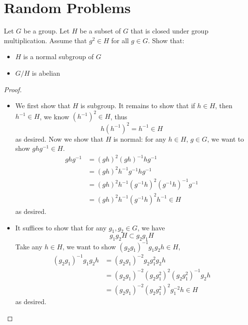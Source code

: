 \section{Random Problems}

\begin{prob}[F2010-Q1]
    Let \( G \) be a group. Let \( H \) be a subset of \( G \) that is closed under group multiplication. Assume that \( g^2 \in H \) for all \( g \in G \). Show that:
    \begin{itemize}
        \item \( H \) is a normal subgroup of \( G \)
        \item \( G/H \) is abelian
    \end{itemize}
\end{prob}
\begin{proof}
    \begin{itemize}
        \item We first show that $H$ is subgroup. It remains to show that if $h\in H$, then $h^{-1}\in H$, we know $(h^{-1})^2\in H$, thus 
        \begin{equation*}
            h(h^{-1})^2=h^{-1}\in H
        \end{equation*}
        as desired.  Now we show that $H$ is normal: for any $h\in H$, $g\in G$, we want to show $ghg^{-1}\in H$.
        \begin{align*}
            ghg^{-1}&=(gh)^2(gh)^{-1}hg^{-1}\\
            &=(gh)^2h^{-1}g^{-1}hg^{-1}\\
            &=(gh)^2h^{-1}(g^{-1}h)^2(g^{-1}h)^{-1}g^{-1}\\
            &=(gh)^2h^{-1}(g^{-1}h)^2h^{-1}\in H
        \end{align*}
        as desired.
        \item It suffices to show that for any $g_1,g_2\in G$, we have 
        \begin{equation*}
            g_1g_2H\subset g_2g_1H
        \end{equation*}
        Take any $h\in H$, we want to show $(g_2g_1)^{-1}g_1g_2h\in H$,
        \begin{align*}
            (g_2g_1)^{-1}g_1g_2h&=(g_2g_1)^{-2}g_2g_1^2g_2h\\
            &=(g_2g_1)^{-2}(g_2g_1^2)^2(g_2g_1^2)^{-1}g_2h\\
            &=(g_2g_1)^{-2}(g_2g_1^2)^2g_1^{-2}h\in H
        \end{align*}
        as desired.
    \end{itemize}
\end{proof}


